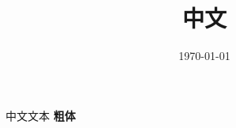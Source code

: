 \documentclass[11pt,a4paper]{article}
\title{中文}
\author{}
\date{\today}
\begin{document}
\maketitle
中文文本 \textbf{粗体}
\end{document}

